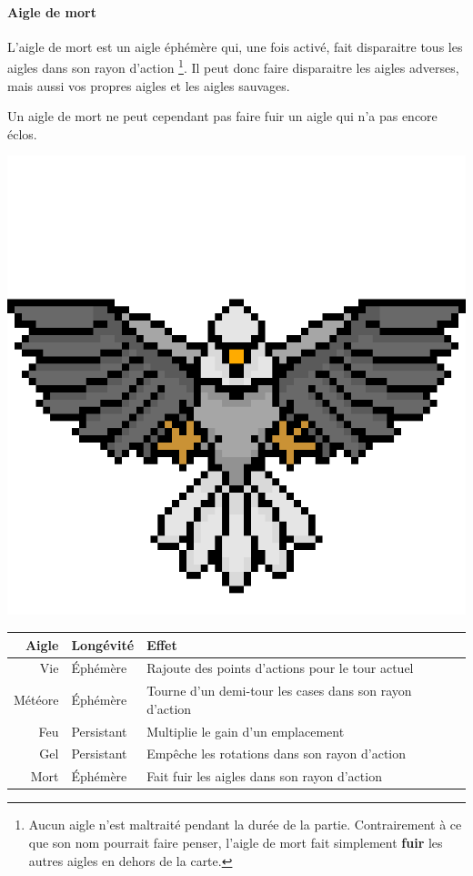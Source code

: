 \begin{minipage}{.75\textwidth}
    \paragraph{Aigle de mort}
    L'aigle de mort est un aigle éphémère qui, une fois activé, fait disparaitre
    tous les aigles dans son rayon d'action
    \footnote{Aucun aigle n'est maltraité pendant la durée de la partie.
    Contrairement à ce que son nom pourrait faire penser, l'aigle de mort fait
    simplement \textbf{fuir} les autres aigles en dehors de la carte.}.
    Il peut donc faire disparaitre les aigles adverses, mais aussi vos propres
    aigles et les aigles sauvages.
    
    Un aigle de mort ne peut cependant pas faire fuir un aigle qui n'a pas encore
    éclos.
\end{minipage}
\begin{minipage}{.2\textwidth}
    \centering
    \includegraphics[width=.8\textwidth]{img/sprites/aigle_peur.png}
\end{minipage}

\begin{table}[h]
    \centering
    \begin{tabular}{r|l|l}
        Aigle   & Longévité & Effet                                                   \\
        \hline
        Vie     & Éphémère  & Rajoute des points d'actions pour le tour actuel        \\
        Météore & Éphémère  & Tourne d'un demi-tour les cases dans son rayon d'action \\
        Feu     & Persistant & Multiplie le gain d'un emplacement                      \\
        Gel     & Persistant & Empêche les rotations dans son rayon d'action            \\
        Mort    & Éphémère  & Fait fuir les aigles dans son rayon d'action            \\
    \end{tabular}
\end{table}

